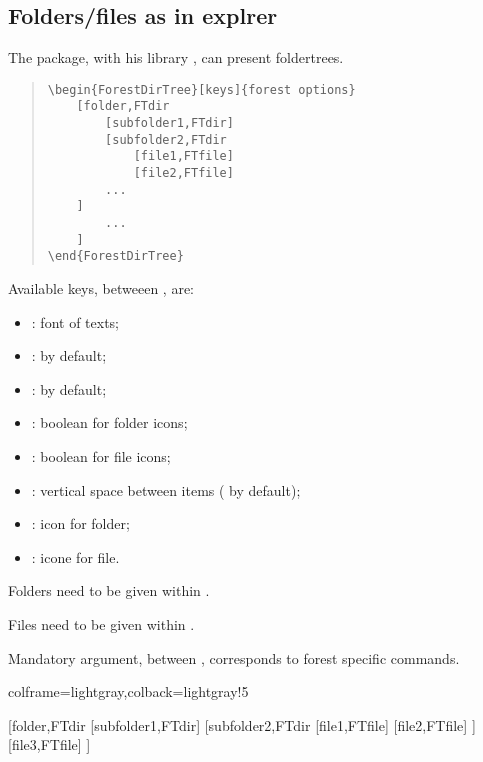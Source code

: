 \documentclass[11pt,a4paper]{ltxdoc}
\begin{document}
\pagebreak

\subsection{Folders/files as in explrer}

The  package, with his library , can present foldertrees.

\begin{quote}
\begin{verbatim}
\begin{ForestDirTree}[keys]{forest options}
    [folder,FTdir
        [subfolder1,FTdir]
        [subfolder2,FTdir
            [file1,FTfile]
            [file2,FTfile]
        ...
    ]
        ...
    ]
\end{ForestDirTree}
\end{verbatim}
\end{quote}

Available \textsf{keys}, betweeen \MontreCode{[...]}, are:

\begin{itemize}
	\item {}: font of texts;
	\item {}:  by default;
	\item {}:  by default;
	\item {}: boolean for folder icons;
	\item {}: boolean for file icons;
	\item {}: vertical space between items (\MontreCode{0.15em} by default);
	\item {}: icon for folder;
	\item {}: icone for file.
\end{itemize}

\medskip

\textsf{Folders} need to be given within .

\textsf{Files} need to be given within .

\medskip

Mandatory argument, between , corresponds to \textsf{forest} specific commands.

\begin{tcblisting}{colframe=lightgray,colback=lightgray!5}
\begin{ForestDirTree}{}
    [folder,FTdir
        [subfolder1,FTdir]
        [subfolder2,FTdir
            [file1,FTfile]
            [file2,FTfile]
        ]
        [file3,FTfile]
    ]
\end{ForestDirTree}
\end{tcblisting}
\end{document}
